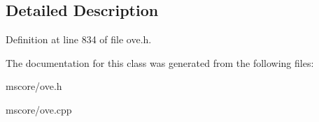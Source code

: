 \subsection{Detailed Description}


Definition at line 834 of file ove.\+h.



The documentation for this class was generated from the following files\+:\begin{DoxyCompactItemize}
\item 
mscore/ove.\+h\item 
mscore/ove.\+cpp\end{DoxyCompactItemize}

